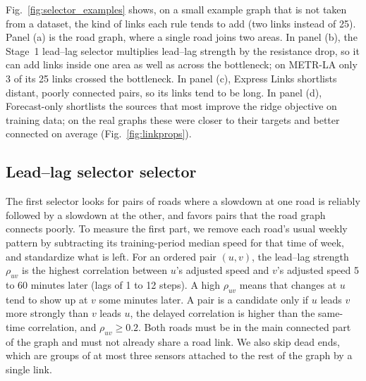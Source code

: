 \documentclass[journal]{IEEEtran}
\begin{document}
Fig.~\ref{fig:selector_examples} shows, on a small example graph that is not taken from a dataset, the kind of links each rule tends to add (two links instead of 25). Panel (a) is the road graph, where a single road joins two areas. In panel (b), the Stage~1 lead--lag selector multiplies lead--lag strength by the resistance drop, so it can add links inside one area as well as across the bottleneck; on METR-LA only 3 of its 25 links crossed the bottleneck. In panel (c), Express Links shortlists distant, poorly connected pairs, so its links tend to be long. In panel (d), Forecast-only shortlists the sources that most improve the ridge objective on training data; on the real graphs these were closer to their targets and better connected on average (Fig.~\ref{fig:linkprops}).


\subsection{Lead--lag selector selector}\label{sec:greedy}
The first selector looks for pairs of roads where a slowdown at one road is reliably followed by a slowdown at the other, and favors pairs that the road graph connects poorly. To measure the first part, we remove each road's usual weekly pattern by subtracting its training-period median speed for that time of week, and standardize what is left. For an ordered pair $(u,v)$, the lead--lag strength $\rho_{uv}$ is the highest correlation between $u$'s adjusted speed and $v$'s adjusted speed 5 to 60 minutes later (lags of 1 to 12 steps). A high $\rho_{uv}$ means that changes at $u$ tend to show up at $v$ some minutes later. A pair is a candidate only if $u$ leads $v$ more strongly than $v$ leads $u$, the delayed correlation is higher than the same-time correlation, and $\rho_{uv}\geq0.2$. Both roads must be in the main connected part of the graph and must not already share a road link. We also skip dead ends, which are groups of at most three sensors attached to the rest of the graph by a single link.
\end{document}
